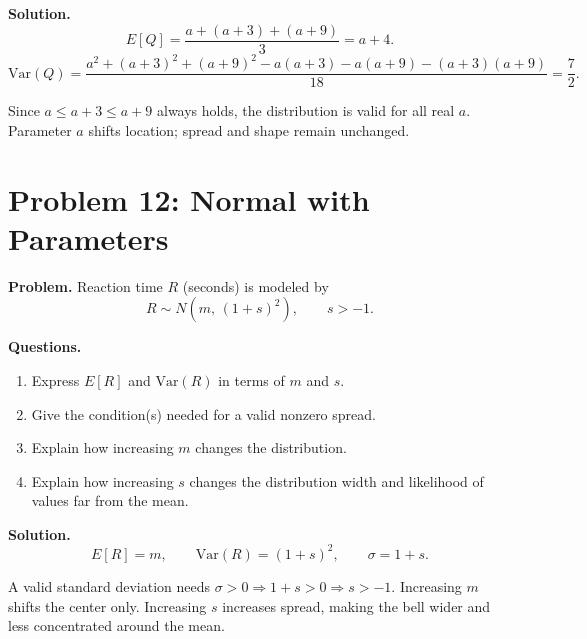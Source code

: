 \textbf{Solution.}
\[
E[Q]=\frac{a+(a+3)+(a+9)}{3}=a+4.
\]
\[
\mathrm{Var}(Q)=\frac{a^2+(a+3)^2+(a+9)^2-a(a+3)-a(a+9)-(a+3)(a+9)}{18}=\frac{7}{2}.
\]
\begin{center}
\end{center}
Since \(a\le a+3\le a+9\) always holds, the distribution is valid for all real \(a\). Parameter \(a\) shifts location; spread and shape remain unchanged.

\section{Problem 12: Normal with Parameters}

\textbf{Problem.}
Reaction time \(R\) (seconds) is modeled by
\[
R\sim N(m,\,(1+s)^2),\qquad s> -1.
\]

\textbf{Questions.}
\begin{enumerate}
  \item Express \(E[R]\) and \(\mathrm{Var}(R)\) in terms of \(m\) and \(s\).
  \item Give the condition(s) needed for a valid nonzero spread.
  \item Explain how increasing \(m\) changes the distribution.
  \item Explain how increasing \(s\) changes the distribution width and likelihood of values far from the mean.
\end{enumerate}

\textbf{Solution.}
\[
E[R]=m,
\qquad
\mathrm{Var}(R)=(1+s)^2,
\qquad
\sigma=1+s.
\]
\begin{center}
\end{center}
A valid standard deviation needs \(\sigma>0\Rightarrow 1+s>0\Rightarrow s>-1\).
Increasing \(m\) shifts the center only. Increasing \(s\) increases spread, making the bell wider and less concentrated around the mean.

